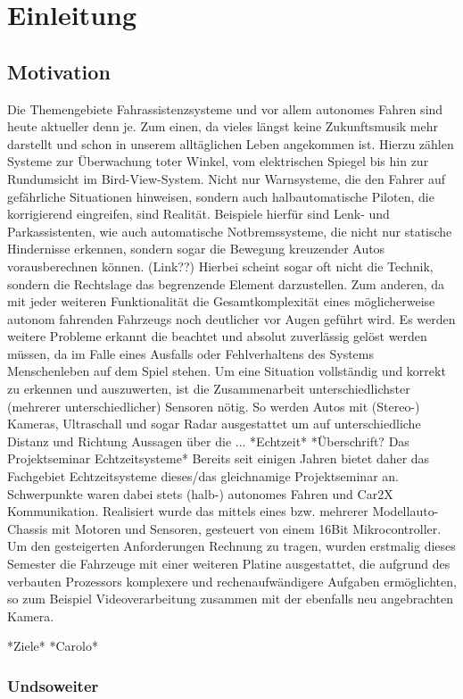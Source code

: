 \section{Einleitung}
\label{sec:einleitung}
\subsection{Motivation}
Die Themengebiete Fahrassistenzsysteme und vor allem autonomes Fahren sind heute aktueller denn je. Zum einen, da vieles längst keine Zukunftsmusik mehr darstellt und schon in unserem alltäglichen Leben angekommen ist. Hierzu zählen Systeme zur Überwachung toter Winkel, vom elektrischen Spiegel bis hin zur Rundumsicht im Bird-View-System. Nicht nur Warnsysteme, die den Fahrer auf gefährliche Situationen hinweisen, sondern auch halbautomatische Piloten, die korrigierend eingreifen, sind Realität. Beispiele hierfür sind Lenk- und Parkassistenten, wie auch automatische Notbremssysteme, die nicht nur statische Hindernisse erkennen, sondern sogar die Bewegung kreuzender Autos vorausberechnen können. (Link??) Hierbei scheint sogar oft nicht die Technik, sondern die Rechtslage das begrenzende Element darzustellen.
\newline
Zum anderen, da mit jeder weiteren Funktionalität die Gesamtkomplexität eines möglicherweise autonom fahrenden Fahrzeugs noch deutlicher vor Augen geführt wird. Es werden weitere Probleme erkannt die beachtet und absolut zuverlässig gelöst werden müssen, da im Falle eines Ausfalls oder Fehlverhaltens des Systems Menschenleben auf dem Spiel stehen. Um eine Situation vollständig und korrekt zu erkennen und auszuwerten, ist die Zusammenarbeit unterschiedlichster (mehrerer unterschiedlicher) Sensoren nötig. So werden Autos mit (Stereo-) Kameras, Ultraschall und sogar Radar ausgestattet um auf unterschiedliche Distanz und Richtung Aussagen über die ... *Echtzeit*
\newline
*Überschrift? Das Projektseminar Echtzeitsysteme*
Bereits seit einigen Jahren bietet daher das Fachgebiet Echtzeitsysteme dieses/das gleichnamige Projektseminar an. Schwerpunkte waren dabei stets (halb-) autonomes Fahren und Car2X Kommunikation. Realisiert wurde das mittels eines bzw. mehrerer Modellauto-Chassis mit Motoren und Sensoren, gesteuert von einem 16Bit Mikrocontroller. Um den gesteigerten Anforderungen Rechnung zu tragen, wurden erstmalig dieses Semester die Fahrzeuge mit einer weiteren Platine ausgestattet, die aufgrund des verbauten Prozessors komplexere und rechenaufwändigere Aufgaben ermöglichten, so zum Beispiel Videoverarbeitung zusammen mit der ebenfalls neu angebrachten Kamera.

*Ziele*
*Carolo*

\subsubsection{Undsoweiter}